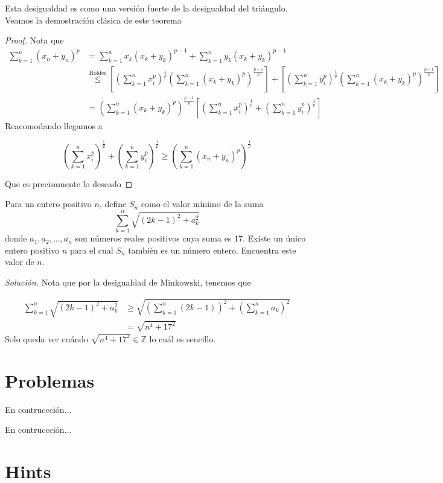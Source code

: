\documentclass[11pt]{scrartcl}
\begin{document}
Esta desigualdad es como una versión fuerte de la desigualdad del triángulo. Veamos la demostración clásica de este teorema
\begin{proof}
Nota que 
\begin{align*}
    \sum_{k=1}^n(x_n+y_n)^p &=\sum_{k=1}^n x_k(x_k+y_k)^{p-1}+\sum_{k=1}^n y_k(x_k+y_k)^{p-1}\\
    &\stackrel{\hyperref[Holder]{\text{Hölder}}}{\leq}
 \left[\left(\sum_{k=1}^n x_i^p\right)^{\frac{1}{p}}\left(\sum_{k=1}^n (x_k+y_k)^p\right)^{\frac{p-1}{p}}\right]+\left[\left(\sum_{k=1}^n y_i^p\right)^{\frac{1}{p}}\left(\sum_{k=1}^n (x_k+y_k)^p\right)^{\frac{p-1}{p}}\right] \\ &=\left(\sum_{k=1}^n (x_k+y_k)^p\right)^{\frac{p-1}{p}}\left[\left(\sum_{k=1}^n x_i^p\right)^{\frac{1}{p}}+ \left(\sum_{k=1}^n y_i^p\right)^{\frac{1}{p}}\right]
\end{align*}
Reacomodando llegamos a

\[\left(\sum_{k=1}^n x_i^p\right)^{\frac{1}{p}}+ \left(\sum_{k=1}^n y_i^p\right)^{\frac{1}{p}}\geq \left(\sum_{k=1}^n(x_n+y_n)^p\right)^{\frac{1}{p}}\]

Que es precisamente lo deseado
\end{proof}
\begin{example}

    Para un entero positivo $n$, define $S_n$ como el valor mínimo de la suma 
\[ \sum_{k=1}^n \sqrt{(2k-1)^2+a_k^2} \] 
donde $a_1,a_2,\ldots,a_n$ son números reales positivos cuya suma es 17. Existe un único entero positivo $n$ para el cual $S_n$ también es un número entero. Encuentra este valor de $n$.
\end{example}

   \textit{Solución.} Nota que por la desigualdad de $\hyperref[Minkowski]{\text{Minkowski}}$, tenemos que 

\begin{align*}
    \sum_{k=1}^n \sqrt{(2k-1)^2+a_k^2}&\geq \sqrt{\left(\sum_{k=1}^n (2k-1)\right)^2+\left(\sum_{k=1}^n a_k\right)^2}\\ &=\sqrt{n^4+17^2}
\end{align*} 
Solo queda ver cuándo $\sqrt{n^4+17^2}\in \mathbb{Z}$ lo cuál es sencillo.
\\
\section{Problemas}




\begin{problem}
En contruccción...

  \begin{hint}
  En contruccción...
  \end{hint}
\end{problem}






\bigskip

\section{Hints}
\begin{enumerate}
  
\end{enumerate}
\end{document}
